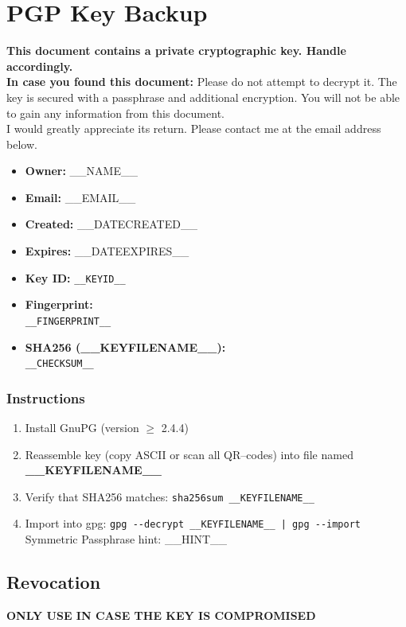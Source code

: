 \documentclass[a4paper,12pt]{article}
\newif\ifrevocation
\begin{document}
\section*{PGP Key Backup}
\textbf{This document contains a private cryptographic key. Handle accordingly.} \\
\textbf{In case you found this document:} 
Please do not attempt to decrypt it. 
The key is secured with a passphrase and additional encryption. 
You will not be able to gain any information from this document.\\
I would greatly appreciate its return. 
Please contact me at the email address below. \\
\begin{itemize}
    \item \textbf{Owner:} __NAME__ 
    \item \textbf{Email:} __EMAIL__ 
    \item \textbf{Created:} __DATECREATED__
    \item \textbf{Expires:} __DATEEXPIRES__ 
    \item \textbf{Key ID:} \verb|__KEYID__|
    \item \textbf{Fingerprint:} \\
          \verb|__FINGERPRINT__| 
    \item \textbf{SHA256 (__KEYFILENAME__):} \\
          \verb|__CHECKSUM__| 
\end{itemize}

\subsubsection*{Instructions}
\begin{enumerate}
    \item Install GnuPG (version $\geq$ 2.4.4)
    \item Reassemble key (copy ASCII or scan all QR--codes) into file named \textbf{__KEYFILENAME__}
    \item Verify that SHA256 matches: \verb|sha256sum __KEYFILENAME__|
    \item Import into gpg: \verb!gpg --decrypt __KEYFILENAME__ | gpg --import! \\
    Symmetric Passphrase hint: __HINT__
\end{enumerate}

\ifrevocation %
\subsection*{Revocation}
\textbf{ONLY USE IN CASE THE KEY IS COMPROMISED}
\end{document}
